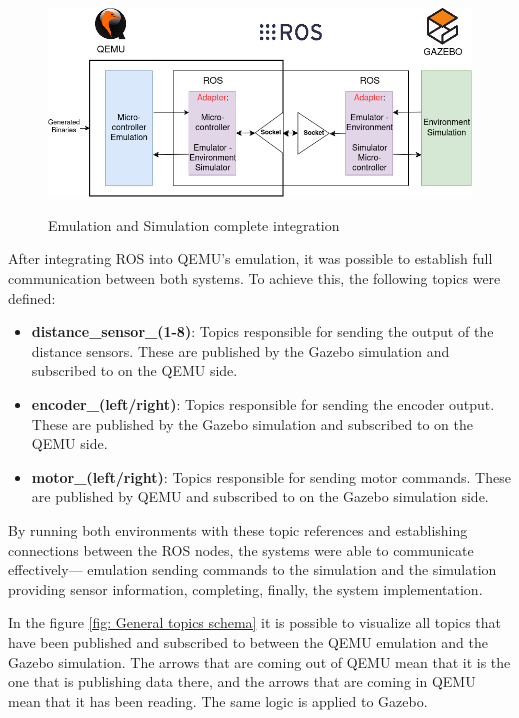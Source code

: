 \documentclass[../../monografia.tex]{subfiles}
\begin{document}
\begin{figure}[h!]
    \caption{Emulation and Simulation complete integration}
    \centering
    \includegraphics[width=16cm]{src/images/complete_integration.png}
    \label{fig: Emulation and Simulation complete integration}
\end{figure}

After integrating ROS into QEMU's emulation, it was possible to establish full communication between both systems. To achieve this, the following topics were defined:


\begin{itemize}
    \item \textbf{distance\_sensor\_(1-8)}: Topics responsible for sending the output of the distance sensors. These are published by the Gazebo simulation and subscribed to on the QEMU side.
    \item \textbf{encoder\_(left/right)}: Topics responsible for sending the encoder output. These are published by the Gazebo simulation and subscribed to on the QEMU side.
    \item \textbf{motor\_(left/right)}: Topics responsible for sending motor commands. These are published by QEMU and subscribed to on the Gazebo simulation side.
\end{itemize}

By running both environments with these topic references and establishing connections between the ROS nodes, the systems were able to communicate effectively— emulation sending commands to the simulation and the simulation providing sensor information, completing, finally, the system implementation. 

In the figure \ref{fig: General topics schema} it is possible to visualize all topics that have been published and subscribed to between the QEMU emulation and the Gazebo simulation. The arrows that are coming out of QEMU mean that it is the one that is publishing data there, and the arrows that are coming in QEMU mean that it has been reading. The same logic is applied to Gazebo.
\end{document}
